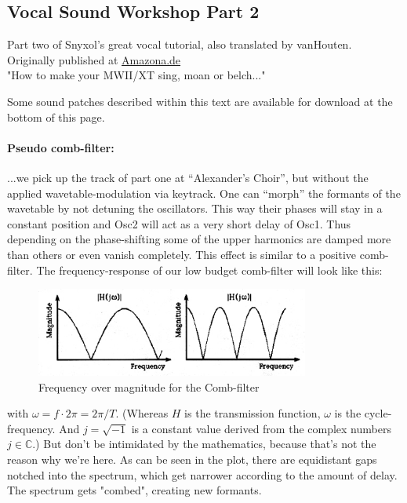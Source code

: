 \subsection{Vocal Sound Workshop Part 2}
Part two of Snyxol's great vocal tutorial, also translated by vanHouten. Originally published at \href{https://www.amazona.de/workshop-vocal-sounds-mit-dem-waldorf-microwave/}{Amazona.de}\\
"How to make your MWII/XT sing, moan or belch..."

Some sound patches described within this text are available for download at the bottom of this page.

\paragraph{ Pseudo comb-filter:}
...we pick up the track of part one at ``Alexander’s Choir'', but without the applied wavetable-modulation via keytrack. One can ``morph'' the formants of the wavetable by not detuning the oscillators. This way their phases will stay in a constant position and Osc2 will act as a very short delay of Osc1. Thus depending on the phase-shifting some of the upper harmonics are damped more than others or even vanish completely. This effect is similar to a positive comb-filter. The frequency-response of our low budget comb-filter will look like this:
\bigskip %
%
\begin{figure}[ht!]
	\centering
	\includegraphics[width=90mm]{pics/comb_filter.png}
	\caption{Frequency over magnitude for the Comb-filter}
	\label{comb-filter}
\end{figure}
with $\omega = f \cdot 2 \pi = 2 \pi / T$. (Whereas $H$ is the transmission function, $\omega$ is the cycle-frequency. And $j = \sqrt{-1}$ is a constant value derived from the complex numbers $j \in \mathbb{C}$.) But don’t be intimidated by the mathematics, because that’s not the reason why we're here. As can be seen in the plot, there are equidistant gaps notched into the spectrum, which get narrower according to the amount of delay. The spectrum gets "combed", creating new formants.\\
